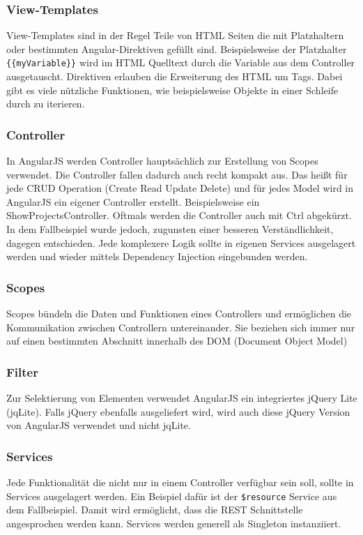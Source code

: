 \subsubsection{View-Templates}
View-Templates sind in der Regel Teile von HTML Seiten die mit Platzhaltern oder bestimmten Angular-Direktiven gefüllt sind.
Beispielsweise der Platzhalter \texttt{\{\{myVariable\}\}} wird im HTML Quelltext durch die Variable aus dem Controller ausgetauscht.
Direktiven erlauben die Erweiterung des HTML um Tags.
Dabei gibt es viele nützliche Funktionen, wie beispielsweise Objekte in einer Schleife durch zu iterieren. 

\subsubsection{Controller}
In AngularJS werden Controller hauptsächlich zur Erstellung von Scopes verwendet.
Die Controller fallen dadurch auch recht kompakt aus.
Das heißt für jede CRUD Operation (Create Read Update Delete) und für jedes Model wird in AngularJS ein eigener Controller erstellt.
Beispielsweise ein ShowProjectsController.
Oftmals werden die Controller auch mit Ctrl abgekürzt.
In dem Fallbeispiel wurde jedoch, zugunsten einer besseren Verständlichkeit, dagegen entschieden.
Jede komplexere Logik sollte in eigenen Services ausgelagert werden und wieder mittels Dependency Injection eingebunden werden. 

\subsubsection{Scopes}
Scopes bündeln die Daten und Funktionen eines Controllers und ermöglichen die Kommunikation zwischen Controllern untereinander.
Sie beziehen sich immer nur auf einen bestimmten Abschnitt innerhalb des DOM (Document Object Model)

\subsubsection{Filter}
Zur Selektierung von Elementen verwendet AngularJS ein integriertes jQuery Lite (jqLite).
Falls jQuery ebenfalls ausgeliefert wird, wird auch diese jQuery Version von AngularJS verwendet und nicht jqLite.

\subsubsection{Services}
Jede Funktionalität die nicht nur in einem Controller verfügbar sein soll, sollte in Services ausgelagert werden. Ein Beispiel dafür ist der \texttt{\$resource} Service aus dem Fallbeispiel.
Damit wird ermöglicht, dass die REST Schnittstelle angesprochen werden kann.
Services werden generell als Singleton instanziiert.

